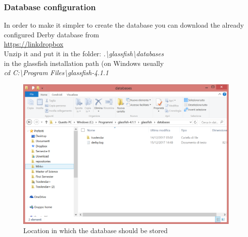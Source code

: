 \subsubsection{Database configuration}
In order to make it simpler to create the database you can download the already configured Derby database from \\
\href{url}{https://linkdropbox}
\\Unzip it and put it in the folder: \textit{.\textbackslash glassfish\textbackslash databases}\\ in the glassfish installation path (on Windows usually \\
\textit{cd C:\textbackslash Program Files\textbackslash glassfish-4.1.1}
\begin{figure}[H]
\begin{center}
		\includegraphics[width=1.1\textwidth]{images/databaselocation}
		\caption{Location in which the database should be stored}
		\label{asadminstart}
\end{center}
\end{figure}


